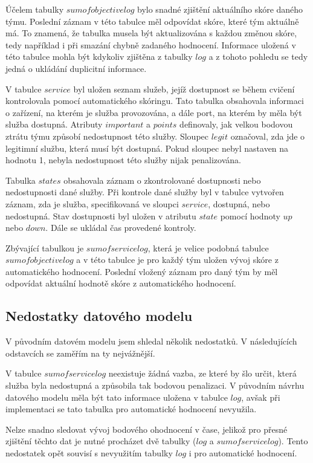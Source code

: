 \documentclass[
  digital, %
  twoside, %
  table,   %
  lof,     %
  lot,     %
]{fithesis3}
\begin{document}
Účelem tabulky $sumofobjectivelog$ bylo snadné zjištění aktuálního skóre daného týmu. Poslední záznam v této tabulce měl odpovídat skóre, které tým aktuálně má. To znamená, že tabulka musela být aktualizována s každou změnou skóre, tedy například i při smazání chybně zadaného hodnocení. Informace uložená v této tabulce mohla být kdykoliv zjištěna z tabulky $log$ a z tohoto pohledu se tedy jedná o ukládání duplicitní informace.

V tabulce $service$ byl uložen seznam služeb, jejíž dostupnost se během cvičení kontrolovala pomocí automatického skóringu. Tato tabulka obsahovala informaci o zařízení, na kterém je služba provozována, a dále port, na kterém by měla být služba dostupná. Atributy $important$ a $points$ definovaly, jak velkou bodovou ztrátu týmu způsobí nedostupnost této služby. Sloupec $legit$ označoval, zda jde o legitimní službu, která musí být dostupná. Pokud sloupec nebyl nastaven na hodnotu 1, nebyla nedostupnost této služby nijak penalizována. 

Tabulka $states$ obsahovala záznam o zkontrolované dostupnosti nebo nedostupnosti dané služby. Při kontrole dané služby byl v tabulce vytvořen záznam, zda je služba, specifikovaná ve sloupci $service$, dostupná, nebo nedostupná. Stav dostupnosti byl uložen v atributu $state$ pomocí hodnoty $up$ nebo $down$. Dále se ukládal čas provedené kontroly.

Zbývající tabulkou je $sumofservicelog$, která je velice podobná tabulce $sumofobjectivelog$ a v této tabulce je pro každý tým uložen vývoj skóre z automatického hodnocení. Poslední vložený záznam pro daný tým by měl odpovídat aktuální hodnotě skóre z automatického hodnocení.

\subsection{Nedostatky datového modelu}

V původním datovém modelu jsem shledal několik nedostatků. V následujících odstavcích se zaměřím na ty nejvážnější.

V tabulce $sumofservicelog$ neexistuje žádná vazba, ze které by šlo určit, která služba byla nedostupná a způsobila tak bodovou penalizaci. V původním návrhu datového modelu měla být tato informace uložena v tabulce $log$, avšak při implementaci se tato tabulka pro automatické hodnocení nevyužila. 

Nelze snadno sledovat vývoj bodového ohodnocení v čase, jelikož pro přesné zjištění těchto dat je nutné procházet dvě tabulky ($log$ a $sumofservicelog$). Tento nedostatek opět souvisí s nevyužitím tabulky $log$ i pro automatické hodnocení.
\end{document}
